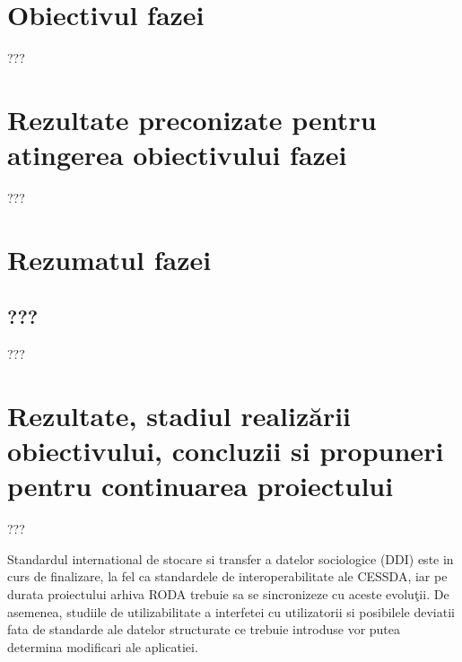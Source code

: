 \documentclass[a4paper, 10pt]{article}
\begin{document}
{\section{Obiectivul fazei}


???

\section{Rezultate preconizate pentru atingerea obiectivului fazei}


???

\section{Rezumatul fazei}

\medskip

\subsection*{???}
???

\medskip

\section{Rezultate, stadiul realiz\u{a}rii obiectivului, concluzii si propuneri pentru continuarea proiectului}

???

\medskip

Standardul international de stocare si transfer a datelor sociologice (DDI) este in curs de finalizare, la fel ca standardele de interoperabilitate ale CESSDA, iar pe durata proiectului arhiva RODA trebuie sa se sincronizeze cu aceste evolu\c{t}ii.
De asemenea, studiile de utilizabilitate a interfetei cu utilizatorii si posibilele deviatii fata de standarde ale datelor structurate ce trebuie introduse vor putea determina modificari ale aplicatiei.


\bigskip

\bigskip

\bigskip

\bigskip

\bigskip

\bigskip

}
\end{document}
